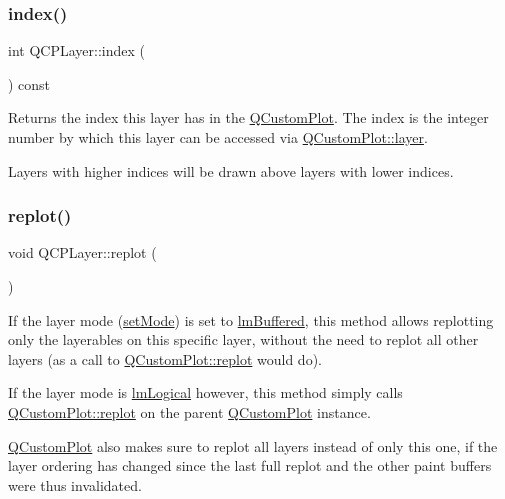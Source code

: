 \subsubsection{\texorpdfstring{index()}{index()}}
{\footnotesize\ttfamily int Q\+C\+P\+Layer\+::index (\begin{DoxyParamCaption}{ }\end{DoxyParamCaption}) const\hspace{0.3cm}{\ttfamily [inline]}}

Returns the index this layer has in the \hyperlink{class_q_custom_plot}{Q\+Custom\+Plot}. The index is the integer number by which this layer can be accessed via \hyperlink{class_q_custom_plot_a0a96244e7773b242ef23c32b7bdfb159}{Q\+Custom\+Plot\+::layer}.

Layers with higher indices will be drawn above layers with lower indices. \mbox{\label{class_q_c_p_layer_adefd53b6db02f470151c416f42e37180}} 
\subsubsection{\texorpdfstring{replot()}{replot()}}
{\footnotesize\ttfamily void Q\+C\+P\+Layer\+::replot (\begin{DoxyParamCaption}{ }\end{DoxyParamCaption})}

If the layer mode (\hyperlink{class_q_c_p_layer_a938d57b04f4e4c23cedf1711f983919b}{set\+Mode}) is set to \hyperlink{class_q_c_p_layer_a67dcfc1590be2a1f2227c5a39bb59c7cada274b1644a2a3c1b794c052f1601bb2}{lm\+Buffered}, this method allows replotting only the layerables on this specific layer, without the need to replot all other layers (as a call to \hyperlink{class_q_custom_plot_aa4bfe7d70dbe67e81d877819b75ab9af}{Q\+Custom\+Plot\+::replot} would do).

If the layer mode is \hyperlink{class_q_c_p_layer_a67dcfc1590be2a1f2227c5a39bb59c7ca6294b5ed9040aede762c626f5108f934}{lm\+Logical} however, this method simply calls \hyperlink{class_q_custom_plot_aa4bfe7d70dbe67e81d877819b75ab9af}{Q\+Custom\+Plot\+::replot} on the parent \hyperlink{class_q_custom_plot}{Q\+Custom\+Plot} instance.

\hyperlink{class_q_custom_plot}{Q\+Custom\+Plot} also makes sure to replot all layers instead of only this one, if the layer ordering has changed since the last full replot and the other paint buffers were thus invalidated.

